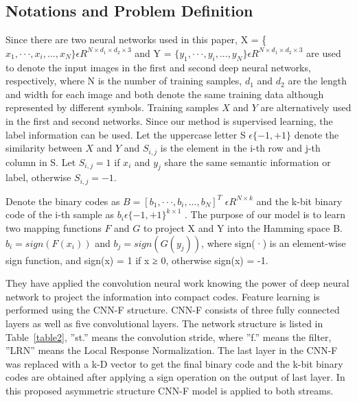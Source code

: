 \subsection{Notations and Problem Definition}
Since there are two neural networks used in this paper,
X = \{$x_{1} , · · · , x_{i} , . . . , x_{N} \}  \epsilon  R^{N \times d_{1}  \times d_{2}\times 3}$ and Y = $\{y_{1} , · · · , y_{i}, . . . , y_{N} \} \epsilon R^{N\times d_{1}\times d_{2}\times 3}$  are used to denote the input images in the first and second deep neural networks, respectively, where N is the number of training samples,
$d_{1}$ and $d_{2}$ are the length and width for each image and both denote the same training data although represented by different symbols. Training samples $X$ and $Y$ are alternatively used in the first and second networks. Since our method is supervised learning, the label information can be used.
Let the uppercase letter S $\epsilon \{−1, +1\}$ denote the similarity between $X$ and $Y$ and $S_{i,j}$ is the element in the i-th row and
j-th column in S. Let $S_{i,j} = 1$ if $x_{i}$ and $y_{j}$ share the same semantic information or label, otherwise $S_{i,j} = −1$.

Denote the binary codes as $B = [b_{1} , · · · , b_{i}, . . . , b_{N} ]^T$	 $\epsilon R^{N \times k} $
 and the k-bit binary code of the i-th sample as $b_{i} \epsilon \{−1, +1\}^{k\times 1}$ . The purpose of our model is to learn two mapping functions $F$ and $G$ to project X and Y into the Hamming space B. $b_{i} = sign(F(x_{i} ))$ and $b_{j} = sign(G(y_{j} ))$,
where sign(·) is an element-wise sign function, and sign(x) =
1 if x ≥ 0, otherwise sign(x) = -1.

They have applied the convolution neural work knowing the power of deep neural network to project the information into compact codes. Feature learning is performed using the CNN-F structure. CNN-F consists of three fully connected layers as well as five convolutional layers. The network structure is listed in Table~\ref{table2}, ”st.” means the convolution stride, where ”f.” means the filter, ”LRN” means the Local Response Normalization. The last layer in the CNN-F was replaced with a k-D vector to get the final binary code and the k-bit binary codes are obtained after applying a sign operation on the output of last layer. In this proposed asymmetric structure CNN-F model is applied to both streams.


